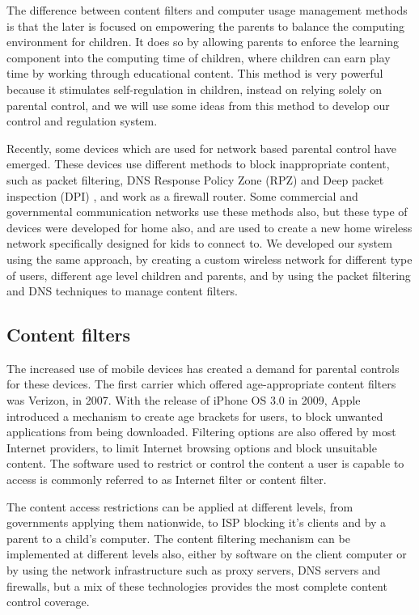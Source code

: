 The difference between content filters and computer usage management methods is that the later is focused on empowering the parents to balance the computing environment for children. It does so by allowing parents to enforce the learning component into the computing time of children, where children can earn play time by working through educational content. This method is very powerful because it stimulates self-regulation in children, instead on relying solely on parental control, and we will use some ideas from this method to develop our control and regulation system.

Recently, some devices which are used for network based parental control have emerged. These devices use different methods to block inappropriate content, such as packet filtering, DNS Response Policy Zone (RPZ) and Deep packet inspection (DPI) \citep{vixie2010dns}, and work as a firewall router. Some commercial and governmental communication networks use these methods also, but these type of devices were developed for home also, and are used to create a new home wireless network specifically designed for kids to connect to. We developed our system using the same approach, by creating a custom wireless network for different type of users, different age level children and parents, and by using the packet filtering and DNS techniques to manage content filters.

\subsection{Content filters}

The increased use of mobile devices has created a demand for parental controls for these devices. The first carrier which offered age-appropriate content filters was Verizon, in 2007. With the release of iPhone OS 3.0 in 2009, Apple introduced a mechanism to create age brackets for users, to block unwanted applications from being downloaded. Filtering options are also offered by most Internet providers, to limit Internet browsing options and block unsuitable content. The software used to restrict or control the content a user is capable to access is commonly referred to as Internet filter or content filter.

The content access restrictions can be applied at different levels, from governments applying them nationwide, to ISP blocking it's clients and by a parent to a child's computer. The content filtering mechanism can be implemented at different levels also, either by software on the client computer or by using the network infrastructure such as proxy servers, DNS servers and firewalls, but a mix of these technologies provides the most complete content control coverage.

